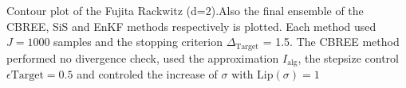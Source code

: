 Contour plot of the Fujita Rackwitz (d=2).Also the final ensemble of the CBREE, SiS and EnKF methods respectively is plotted. Each method used $J=1000$ samples and the stopping criterion $\Delta_{\text{Target}}$ = 1.5. The CBREE method performed no divergence check, used the approximation $I_\text{alg}$, the stepsize control $\epsilon{\text{Target}}=0.5$ and controled the increase of $\sigma$ with $\text{Lip}(\sigma) = 1$
